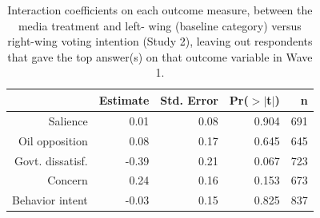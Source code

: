 \begin{table}[ht]
\centering
\caption{Interaction coefficients on each outcome measure, between the media treatment and left-
                      wing (baseline category) versus right-wing voting intention (Study 2),
                      leaving out respondents that gave the top answer(s) on that outcome variable in Wave 1.} 
\label{tab:disruption_noceiling_pol}
\begin{tabular}{rrrrr}
  \hline
 & Estimate & Std. Error & Pr($>$$|$t$|$) & n \\ 
  \hline
Salience & 0.01 & 0.08 & 0.904 & 691 \\ 
  Oil opposition & 0.08 & 0.17 & 0.645 & 645 \\ 
  Govt. dissatisf. & -0.39 & 0.21 & 0.067 & 723 \\ 
  Concern & 0.24 & 0.16 & 0.153 & 673 \\ 
  Behavior intent & -0.03 & 0.15 & 0.825 & 837 \\ 
   \hline
\end{tabular}
\end{table}
